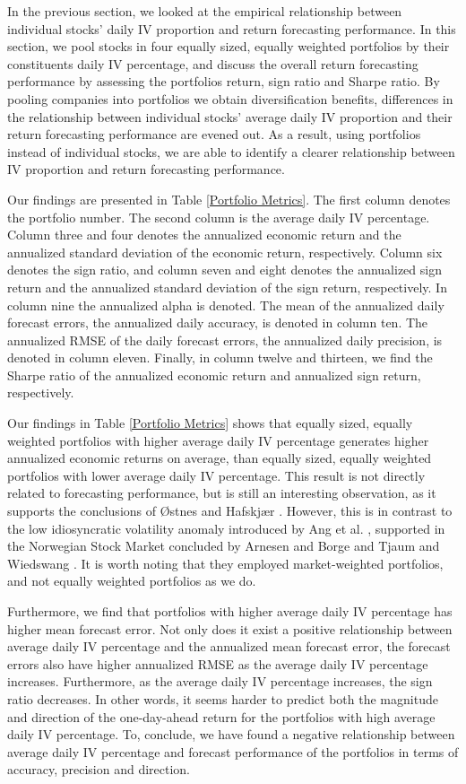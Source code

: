In the previous section, we looked at the empirical relationship between individual stocks' daily IV proportion and return forecasting performance. In this section, we pool stocks in four equally sized, equally weighted portfolios by their constituents daily IV percentage, and discuss the overall return forecasting performance by assessing the portfolios return, sign ratio and Sharpe ratio. By pooling companies into portfolios we obtain diversification benefits, differences in the relationship between individual stocks' average daily IV proportion and their return forecasting performance are evened out. As a result, using portfolios instead of individual stocks, we are able to identify a clearer relationship between IV proportion and return forecasting performance. 

Our findings are presented in Table \ref{Portfolio Metrics}. The first column denotes the portfolio number. The second column is the average daily IV percentage. Column three and four denotes the annualized economic return and the annualized standard deviation of the economic return, respectively. Column six denotes the sign ratio, and column seven and eight denotes the annualized sign return and the annualized standard deviation of the sign return, respectively. In column nine the annualized alpha is denoted. The mean of the annualized daily forecast errors, the annualized daily accuracy, is denoted in column ten. The annualized RMSE of the daily forecast errors, the annualized daily precision, is denoted in column eleven. Finally, in column twelve and thirteen, we find the Sharpe ratio of the annualized economic return and annualized sign return, respectively. 

Our findings in Table \ref{Portfolio Metrics} shows that equally sized, equally weighted portfolios with higher average daily IV percentage generates higher annualized economic returns on average, than equally sized, equally weighted portfolios with lower average daily IV percentage. This result is not directly related to forecasting performance, but is still an interesting observation, as it supports the conclusions of Østnes and Hafskjær \cite{ostnes}. However, this is in contrast to the low idiosyncratic volatility anomaly introduced by Ang et al. \cite{angetal06}, supported in the Norwegian Stock Market concluded by Arnesen and Borge \cite{arnborge} and Tjaum and Wiedswang \cite{thaumwiedswang}. It is worth noting that they employed market-weighted portfolios, and not equally weighted portfolios as we do.

Furthermore, we find that portfolios with higher average daily IV percentage has higher mean forecast error. Not only does it exist a positive relationship between average daily IV percentage and the annualized mean forecast error, the forecast errors also have higher annualized RMSE as the average daily IV percentage increases. Furthermore, as the average daily IV percentage increases, the sign ratio decreases. In other words, it seems harder to predict both the magnitude and direction of the one-day-ahead return for the portfolios with high average daily IV percentage. To, conclude, we have found a negative relationship between average daily IV percentage and forecast performance of the portfolios in terms of accuracy, precision and direction. 

